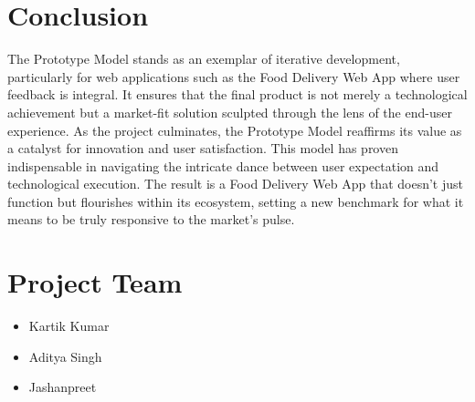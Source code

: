 \documentclass{article}
\begin{document}
\section{Conclusion}
The Prototype Model stands as an exemplar of iterative development, particularly for web applications such as the Food Delivery Web App where user feedback is integral. It ensures that the final product is not merely a technological achievement but a market-fit solution sculpted through the lens of the end-user experience. As the project culminates, the Prototype Model reaffirms its value as a catalyst for innovation and user satisfaction. This model has proven indispensable in navigating the intricate dance between user expectation and technological execution. The result is a Food Delivery Web App that doesn't just function but flourishes within its ecosystem, setting a new benchmark for what it means to be truly responsive to the market's pulse.

\section*{Project Team}

\begin{itemize}
    \item Kartik Kumar
    \item Aditya Singh
    \item Jashanpreet
\end{itemize}
\end{document}
